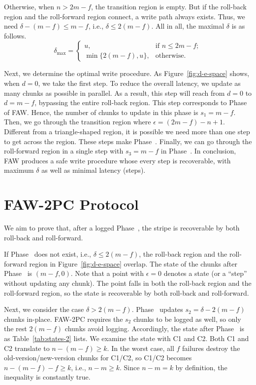 \documentclass[letterpaper,10pt,twocolumn]{article}
\def\protocol/{FAW}
\begin{document}
Otherwise, when $n > 2m - f$, the transition region is empty. But if the
roll-back region and the roll-forward region connect, a write path 
always exists. Thus, we need
$\delta - (m - f) \le m - f$, i.e., $\delta \le 2(m
- f)$. All in all, the maximal $\delta$ is as follows.
\begin{equation}
\delta_{\max} =
\begin{cases}
u, & \text{if } n \le 2m-f;\\
\min\{2(m-f), u\}, & \text{otherwise.}
\end{cases}
\label{eq:delta}
\end{equation}

Next, we determine the optimal write procedure.
As Figure~\ref{fig:d-e-space} shows, when $d = 0$, we take the first step. To reduce the overall latency, we update as many chunks as possible in parallel.
As a result, this step will reach from $d=0$ to $d=m-f$, bypassing the entire roll-back region.
This step corresponds to Phase~ of \protocol/.
Hence, the number of chunks to update in this phase is $s_1=m-f$.
Then, we go through the transition region where $\epsilon = (2m - f) - n + 1$.
Different from a triangle-shaped region, it is possible we need more than one
step to get across the region.
These steps make Phase~.
Finally, we can go through the roll-forward region in a single step with $s_3=m-f$ in Phase~.
In conclusion, \protocol/ produces a safe write procedure whose every step is recoverable, with maximum $\delta$ as well as minimal latency (steps).

\section{\protocol/-2PC Protocol}
\label{sec:2pc}

We aim to prove that, after a logged Phase~, the stripe is recoverable by both roll-back and roll-forward.

If Phase~ does not exist, i.e., $\delta \le 2(m-f)$, the roll-back region and the roll-forward region in Figure~\ref{fig:d-e-space} overlap.
The state of the chunks after Phase~ is $(m-f,0)$.
Note that a point with $\epsilon=0$ denotes a state (or a ``step'' without updating any chunk).
The point falls in both the roll-back region and the roll-forward region, so the state is recoverable by both roll-back and roll-forward.

Next, we consider the case $\delta > 2(m-f)$.
Phase~ updates $s_2=\delta-2(m-f)$ chunks in-place.
\protocol/-2PC requires the $s_2$ chunks to be logged as well, so only the rest $2(m-f)$ chunks avoid logging.
Accordingly, the state after Phase~ is as Table~\ref{tab:states-2} lists.
We examine the state with C1 and C2.
Both C1 and C2 translate to $n-(m-f) \ge k$.
In the worst case, all $f$ failures destroy the old-version/new-version chunks for C1/C2, so C1/C2 becomes $n-(m-f)-f \ge k$, i.e., $n-m \ge k$.
Since $n-m=k$ by definition, the inequality is constantly true.
\end{document}
